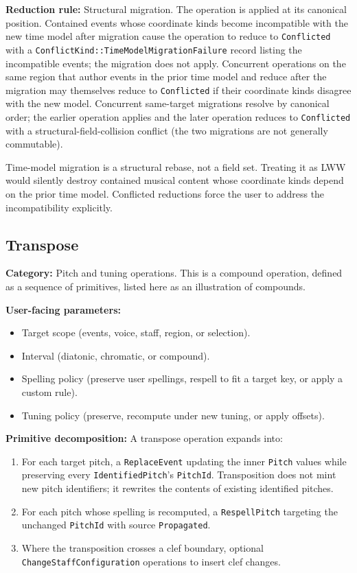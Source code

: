 \documentclass[11pt,letterpaper]{report}
\begin{document}
\textbf{Reduction rule:} Structural migration. The operation is
applied at its canonical position. Contained events whose coordinate
kinds become incompatible with the new time model after migration
cause the operation to reduce to \texttt{Conflicted} with a
\texttt{ConflictKind::TimeModelMigrationFailure} record listing the
incompatible events; the migration does not apply. Concurrent
operations on the same region that author events in the prior time
model and reduce after the migration may themselves reduce to
\texttt{Conflicted} if their coordinate kinds disagree with the new
model. Concurrent same-target migrations resolve by canonical order;
the earlier operation applies and the later operation reduces to
\texttt{Conflicted} with a structural-field-collision conflict (the
two migrations are not generally commutable).

\begin{rationale}
  Time-model migration is a structural rebase, not a field set.
  Treating it as LWW would silently destroy contained musical
  content whose coordinate kinds depend on the prior time model.
  Conflicted reductions force the user to address the incompatibility
  explicitly.
\end{rationale}

\subsection{Transpose}

\textbf{Category:} Pitch and tuning operations. This is a compound
operation, defined as a sequence of primitives, listed here as an
illustration of compounds.

\textbf{User-facing parameters:}
\begin{itemize}
  \item Target scope (events, voice, staff, region, or selection).
  \item Interval (diatonic, chromatic, or compound).
  \item Spelling policy (preserve user spellings, respell to fit a
    target key, or apply a custom rule).
  \item Tuning policy (preserve, recompute under new tuning, or
    apply offsets).
\end{itemize}

\textbf{Primitive decomposition:} A transpose operation expands into:

\begin{enumerate}
  \item For each target pitch, a \texttt{ReplaceEvent} updating the
    inner \texttt{Pitch} values while preserving every
    \texttt{IdentifiedPitch}'s \texttt{PitchId}. Transposition does
    not mint new pitch identifiers; it rewrites the contents of
    existing identified pitches.
  \item For each pitch whose spelling is recomputed, a
    \texttt{RespellPitch} targeting the unchanged \texttt{PitchId}
    with source \texttt{Propagated}.
  \item Where the transposition crosses a clef boundary, optional
    \texttt{ChangeStaffConfiguration} operations to insert clef
    changes.
\end{enumerate}
\end{document}
